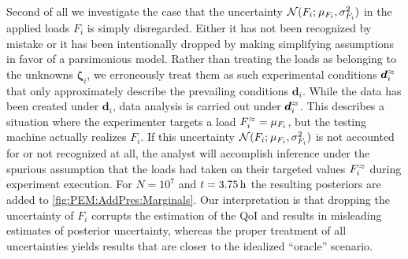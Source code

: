 Second of all we investigate the case that the uncertainty \(\mathcal{N}(F_i ;{\:\!} \mu_{F_i},\sigma_{F_i}^2)\) in the applied loads \(F_i\) is simply disregarded.
Either it has not been recognized by mistake or it has been intentionally dropped by making simplifying assumptions in favor of a parsimonious model.
Rather than treating the loads as belonging to the unknowns \(\bm{\zeta}_i\), we erroneously treat them as such experimental conditions \({\bm{d}}^\approx_i\) that only approximately describe the prevailing conditions \(\bm{d}_i\).
While the data has been created under \(\bm{d}_i\), data analysis is carried out under \({\bm{d}}^\approx_i\).
This describes a situation where the experimenter targets a load \({F}^\approx_i = \mu_{F_i}\), but the testing machine actually realizes \(F_i\).
If this uncertainty \(\mathcal{N}(F_i ;{\:\!} \mu_{F_i},\sigma_{F_i}^2)\) is not accounted for or not recognized at all,
the analyst will accomplish inference under the spurious assumption that the loads had taken on their targeted values \({F}^\approx_i\) during experiment execution.
For \(N=10^7\) and \(t=\unit[3.75]{h}\) the resulting posteriors are added to \cref{fig:PEM:AddPres:Marginals}.
Our interpretation is that dropping the uncertainty of \(F_i\) corrupts the estimation of the QoI and results in misleading estimates of posterior uncertainty,
whereas the proper treatment of all uncertainties yields results that are closer to the idealized ``oracle'' scenario.

